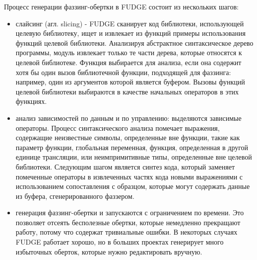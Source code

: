 Процесс генерации фаззинг-обертки в FUDGE состоит из нескольких шагов:
\begin{itemize}
    \item слайсинг (агл. slicing) - FUDGE сканирует код библиотеки, использующей целевую библиотеку, ищет и извлекает из функций примеры использования функций целевой библиотеки. Анализируя абстрактное синтаксическое дерево программы, модуль извлекает только те части дерева, которые относятся к целевой библиотеке. Функция выбирается для анализа, если она содержит хотя бы один вызов библиотечной функции, подходящей для фаззинга: например, один из аргументов которой является буфером. Вызовы функций целевой библиотеки выбираются в качестве начальных операторов в этих функциях.
    \item анализ зависимостей по данным и по управлению: выделяются зависимые операторы. Процесс синтаксического анализа помечает выражения, содержащие неизвестные символы, определенные вне функции, такие как параметр функции, глобальная переменная, функция, определенная в другой единице трансляции, или неимпримитивные типы, определенные вне целевой библиотеки. Следующим шагом является синтез кода, который заменяет помеченные операторы в извлеченных частях кода новыми выражениями с использованием сопоставления с образцом, которые могут содержать данные из буфера, сгенерированного фаззером.
    \item генерация фаззинг-обертки и запускаются с ограничением по времени. Это позволяет отсеять бесполезные обертки, которые немедленно прекращают работу, потому что содержат тривиальные ошибки. В некоторых случаях FUDGE работает хорошо, но в больших проектах генерирует много избыточных оберток, которые нужно редактировать вручную.
\end{itemize}

